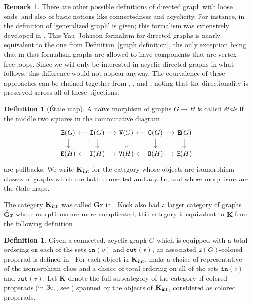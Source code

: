 \documentclass{amsart}
\numberwithin{theorem}{subsection}
\theoremstyle{definition}
\newtheorem{definition}[theorem]{Definition}
\newtheorem{remark}[theorem]{Remark}
\newcommand{\name}[1]{\ensuremath{\text{\textup{#1}}}}
\newcommand{\kockgraphs}{\mathbf{K}}
\newcommand{\kockint}{\kockgraphs_{\name{int}}}
\newcommand{\Set}{\name{Set}}
\newcommand{\out}{\mathtt{out}}
\newcommand{\inp}{\mathtt{in}}
\newcommand{\edge}{\mathtt{E}}
\newcommand{\vertex}{\mathtt{V}}
\begin{document}
\begin{remark}
There are other possible definitions of directed graph with loose ends, and also of basic notions like connectedness and acyclicity.
For instance, in \cite[\S 2.1.2]{hrybook} the definition of `generalized graph' is given; this formalism was extensively developed in \cite{YauJohnson:FPAM}.
This Yau--Johnson formalism for directed graphs is nearly equivalent to the one from Definition~\ref{graph definition}, the only exception being that in that formalism graphs are allowed to have components that are vertex-free loops.
Since we will only be interested in acyclic directed graphs in what follows, this difference would not appear anyway.
The equivalence of these approaches can be chained together from \cite[1.1.12]{Kock_Properads}, \cite[Proposition 15.2]{batanin-berger}, and \cite[Proposition 15.6]{batanin-berger}, noting that the directionality is preserved across all of these bijections.
\end{remark}

\begin{definition}[\'Etale map]
\label{definition kockint}
A na\"ive morphism of graphs $G\to H$ is called \emph{\'etale} if the middle two squares in the commutative diagram
\[ \begin{tikzcd}[column sep=small, row sep=scriptsize]
\edge(G)  \dar & \mathtt{I}(G) \lar \rar \dar & \vertex(G) \dar & \lar \mathtt{O}(G) \rar \dar & \edge(G) \dar \\
\edge(H)  & \mathtt{I}(H) \lar \rar & \vertex(H) & \lar \mathtt{O}(H) \rar & \edge(H)
\end{tikzcd} \]
are pullbacks.
We write $\kockint$ for the category whose objects are isomorphism classes of graphs which are both connected and acyclic, and whose morphisms are the \'etale maps.
\end{definition}

The category $\kockint$ was called $\mathbf{Gr}$ in \cite{Kock_Properads}.
Kock also had a larger category of graphs $\widetilde{\mathbf{Gr}}$ whose morphisms are more complicated; this category is equivalent to $\kockgraphs$ from the following definition.

\begin{definition}
\label{definition kockgraphs}
Given a connected, acyclic graph $G$ which is equipped with a total ordering on each of the sets $\inp(v)$ and $\out(v)$, an associated $\edge(G)$-colored properad is defined in \cite[Definition 5.7]{hrybook}.
For each object in $\kockint$, make a choice of representative of the isomorphism class and a choice of total ordering on all of the sets $\inp(v)$ and $\out(v)$.
Let $\kockgraphs$ denote the full subcategory of the category of colored properads (in $\Set$, see \cite[Definition 3.5]{hrybook}) spanned by the objects of $\kockint$, considered as colored properads.
\end{definition}
\end{document}

